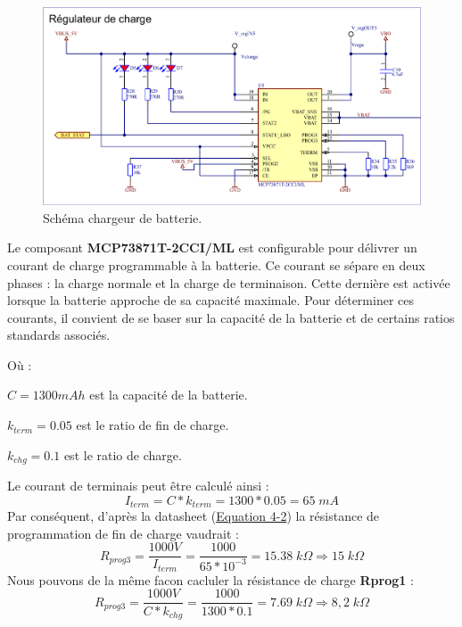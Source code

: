 \begin{figure}[h]
	\centering
	\includegraphics[width=.93\linewidth]{../figures/etude/sch/CHRG-BAT}
	\caption{Schéma chargeur de batterie.}
	\label{fig:chrg-bat}
\end{figure}

Le composant \textbf{MCP73871T-2CCI/ML} est configurable pour délivrer un courant de charge programmable à la batterie. Ce courant se sépare en deux phases : la charge normale et la charge de terminaison. Cette dernière est activée lorsque la batterie approche de sa capacité maximale. Pour déterminer ces courants, il convient de se baser sur la capacité de la batterie et de certains ratios standards associés.

Où :

$C = 1300 mAh$ est la capacité de la batterie.

$k_{term} = 0.05$ est le ratio de fin de charge.

$k_{chg} = 0.1$ est le ratio de charge.

Le courant de terminais peut être calculé ainsi :
\begin{equation*}
	I_{term} = C * k_{term} = 1300 * 0.05 = 65 \; mA
\end{equation*}
Par conséquent, d'après la \gls{datasheet} (\href{https://ww1.microchip.com/downloads/en/DeviceDoc/MCP73871-Data-Sheet-20002090E.pdf}{Equation 4-2}) la résistance de programmation de fin de charge vaudrait :
\begin{equation*}
	R_{prog3} = \frac{1000V}{I_{term}} = \frac{1000}{65*10^{-3}} = 15.38 \; k\Omega \Rightarrow 15 \; k\Omega
\end{equation*}
Nous pouvons de la même facon cacluler la résistance de charge \textbf{Rprog1} :
\begin{equation*}
	R_{prog3} = \frac{1000V}{C*k_{chg}} = \frac{1000}{1300*0.1} = 7.69 \; k\Omega \Rightarrow 8,2 \; k\Omega
\end{equation*}


